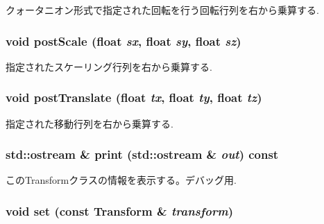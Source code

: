 クォータニオン形式で指定された回転を行う回転行列を右から乗算する. \hypertarget{classm3g_1_1Transform_4cbb4aa3878b658da54a144896f71446}{
\subsubsection[{postScale}]{\setlength{\rightskip}{0pt plus 5cm}void postScale (float {\em sx}, \/  float {\em sy}, \/  float {\em sz})}}
\label{classm3g_1_1Transform_4cbb4aa3878b658da54a144896f71446}


指定されたスケーリング行列を右から乗算する. \hypertarget{classm3g_1_1Transform_638498b811d6ccdf60b7f1f3de157ed6}{
\subsubsection[{postTranslate}]{\setlength{\rightskip}{0pt plus 5cm}void postTranslate (float {\em tx}, \/  float {\em ty}, \/  float {\em tz})}}
\label{classm3g_1_1Transform_638498b811d6ccdf60b7f1f3de157ed6}


指定された移動行列を右から乗算する. \hypertarget{classm3g_1_1Transform_6fea17fa1532df3794f8cb39cb4f911f}{
\subsubsection[{print}]{\setlength{\rightskip}{0pt plus 5cm}std::ostream \& print (std::ostream \& {\em out}) const}}
\label{classm3g_1_1Transform_6fea17fa1532df3794f8cb39cb4f911f}


このTransformクラスの情報を表示する。デバッグ用. \hypertarget{classm3g_1_1Transform_8926ff19517a76de8f938025e9d3163d}{
\subsubsection[{set}]{\setlength{\rightskip}{0pt plus 5cm}void set (const {\bf Transform} \& {\em transform})}}
\label{classm3g_1_1Transform_8926ff19517a76de8f938025e9d3163d}


